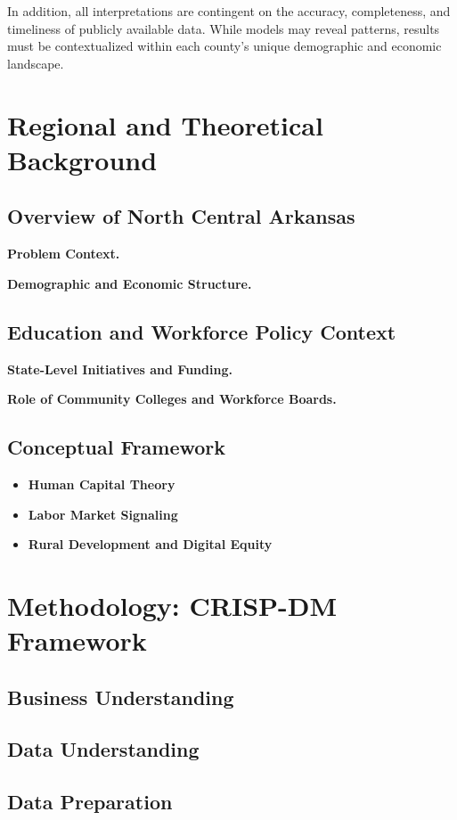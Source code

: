 \documentclass[12pt]{llncs}
\begin{document}
In addition, all interpretations are contingent on the accuracy, completeness, and timeliness of publicly available data. While models may reveal patterns, results must be contextualized within each county’s unique demographic and economic landscape.

\section{Regional and Theoretical Background}

\subsection{Overview of North Central Arkansas}
\textbf{Problem Context.}  

\textbf{Demographic and Economic Structure.} 
\subsection{Education and Workforce Policy Context}
\textbf{State-Level Initiatives and Funding.} 

\textbf{Role of Community Colleges and Workforce Boards.} 

\subsection{Conceptual Framework}
\begin{itemize}
  \item \textbf{Human Capital Theory}
  \item \textbf{Labor Market Signaling}
  \item \textbf{Rural Development and Digital Equity}
\end{itemize}

\section{Methodology: CRISP-DM Framework}
\subsection{Business Understanding}

\subsection{Data Understanding}

\subsection{Data Preparation}
\end{document}
